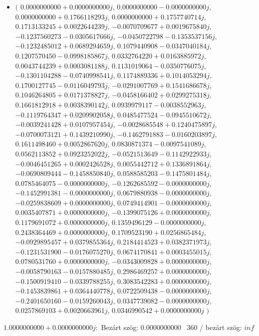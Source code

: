 \documentclass[14pt,a4paper]{article}
\begin{document}
\begin{itemize}
\item
$\big($
$0.0000000000+0.0000000000j$, $0.0000000000-0.0000000000j$, $0.0000000000+0.1766118293j$, $0.0000000000+0.1757740714j$, $0.1713133245+0.0022644239j$, $-0.0070709677+0.0019675840j$, $-0.1237560273-0.0305617666j$, $-0.0450722798-0.1353537156j$, $-0.1232485012+0.0689294659j$, $0.1079440908-0.0347040184j$, $0.1207570450-0.0998185867j$, $0.0332764220+0.0163885972j$, $0.0043744239+0.0003081188j$, $0.1131019064-0.0350776075j$, $-0.1301104288-0.0740998541j$, $0.1174889336+0.1014053294j$, $0.1700127745-0.0116049793j$, $-0.0291007769+0.1541686678j$, $0.1046264805+0.0171378827j$, $-0.0458166402+0.0299275318j$, $0.1661812918+0.0038390142j$, $0.0939979117-0.0038552963j$, $-0.1119764347+0.0209902058j$, $0.0485477524-0.0945510672j$, $-0.0039241428+0.0107957454j$, $-0.0028685548+0.1240475897j$, $-0.0700073121+0.1439210990j$, $-0.1462791883-0.0160203897j$, $0.1611498460+0.0052867620j$, $0.0830871374-0.0097541089j$, $0.0562113852+0.0923252022j$, $-0.0521513649-0.1142922933j$, $-0.0046451265+0.0002426528j$, $0.0055442712+0.1336891864j$, $-0.0690809444-0.1458850840j$, $0.0588585203-0.1475801484j$, $0.0785464075-0.0000000000j$, $-0.1262685592-0.0000000000j$, $-0.1452991381-0.0000000000j$, $0.0679880938-0.0000000000j$, $-0.0259838609+0.0000000000j$, $0.0749414901-0.0000000000j$, $0.0035407871+0.0000000000j$, $-0.1399075126+0.0000000000j$, $0.1179691072+0.0000000000j$, $0.1359496129-0.0000000000j$, $0.2438364469+0.0000000000j$, $0.1709523190+0.0256865484j$, $-0.0929895457+0.0379855364j$, $0.2184414523+0.0382371973j$, $-0.1231531900-0.0176075270j$, $0.0674170841+0.0003455015j$, $0.0780531760+0.0000000000j$, $-0.0343009828+0.0000000000j$, $-0.0058790163-0.0157880485j$, $0.2986469257+0.0000000000j$, $-0.1500919410-0.0339788255j$, $0.3083542283+0.0000000000j$, $-0.1453839861+0.0364440778j$, $0.0722509438-0.0000000000j$, $-0.2401650160-0.0159260043j$, $0.0347739082-0.0000000000j$, $0.0257869103+0.0020663961j$, $0.0346990542+0.0000000000j$
$\big)$
\end{itemize}
$1.0000000000+0.0000000000j$:\
Bezárt szög: $0.0000000000$ \
360 / bezárt szög: $inf$\
\end{document}

